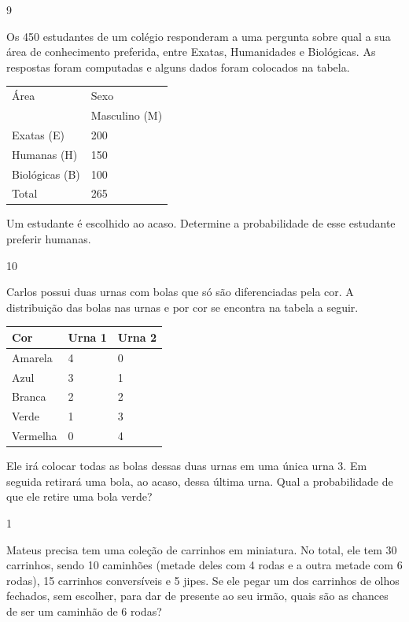 {\begin{escolha}

\num{9}

Os 450 estudantes de um colégio responderam a uma pergunta sobre qual a
sua área de conhecimento preferida, entre Exatas, Humanidades e
Biológicas. As respostas foram computadas e alguns dados foram colocados
na tabela.

\begin{longtable}[]{@{}ll@{}}
\toprule
Área & Sexo\tabularnewline
& Masculino (M)\tabularnewline
Exatas (E) & 200\tabularnewline
Humanas (H) & 150\tabularnewline
Biológicas (B) & 100\tabularnewline
Total & 265\tabularnewline
\bottomrule
\end{longtable}

Um estudante é escolhido ao acaso. Determine a probabilidade de esse
estudante preferir humanas.


\num{10}

Carlos possui duas urnas com bolas que só são diferenciadas pela cor. A
distribuição das bolas nas urnas e por cor se encontra na tabela a
seguir.

\begin{longtable}[]{@{}lll@{}}
\toprule
Cor & Urna 1 & Urna 2\tabularnewline
\midrule
\endhead
Amarela & 4 & 0\tabularnewline
Azul & 3 & 1\tabularnewline
Branca & 2 & 2\tabularnewline
Verde & 1 & 3\tabularnewline
Vermelha & 0 & 4\tabularnewline
\bottomrule
\end{longtable}

Ele irá colocar todas as bolas dessas duas urnas em uma única urna 3. Em
seguida retirará uma bola, ao acaso, dessa última urna. Qual a
probabilidade de que ele retire uma bola verde?



\num{1}

Mateus precisa tem uma coleção de carrinhos em miniatura. No total, ele tem 30 carrinhos, sendo 10 caminhões (metade deles com 4 rodas e a outra metade com 6 rodas), 15 carrinhos conversíveis e 5 jipes. Se ele pegar um dos carrinhos de olhos fechados, sem escolher, para dar de presente ao seu irmão, quais são as chances de ser um caminhão de 6 rodas?


\end{escolha}}
